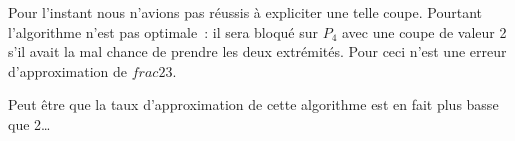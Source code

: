 Pour l'instant nous n'avions pas réussis à expliciter une telle coupe. Pourtant l'algorithme n'est pas optimale~: il sera bloqué sur $P_4$ avec une coupe de valeur 2 s'il avait la mal chance de prendre les deux extrémités. Pour ceci n'est une erreur d'approximation de $frac{2}{3}$.

Peut être que la taux d'approximation de cette algorithme est en fait plus basse que 2\dots

